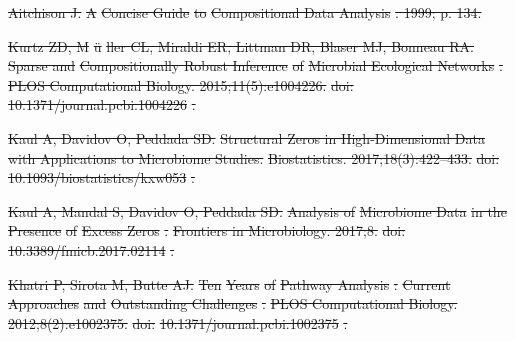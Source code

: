 \documentclass[10pt,letterpaper]{article}
\providecommand{\DIFdeltex}[1]{{\protect\color{red}\sout{#1}}}                      %
\providecommand{\DIFdel}[1]{\texorpdfstring{\DIFdeltex{#1}}{}} %
\begin{document}
\DIFdel{Aitchison J.
}%
\DIFdel{A }%
\DIFdel{Concise Guide}%
\DIFdel{to }%
\DIFdel{Compositional Data Analysis}%
\DIFdel{. 1999; p. 134.
}%

\DIFdel{Kurtz ZD, M}%
\DIFdel{\"u}%
\DIFdel{ller CL, Miraldi ER, Littman DR, Blaser MJ, Bonneau RA.
}%
\DIFdel{Sparse and }%
\DIFdel{Compositionally Robust Inference}%
\DIFdel{of }%
\DIFdel{Microbial
  Ecological Networks}%
\DIFdel{.
}%
\DIFdel{PLOS Computational Biology. 2015;11(5):e1004226.
}%
\DIFdel{doi:}%
\DIFdel{10.1371/journal.pcbi.1004226}%
\DIFdel{.
}%

\DIFdel{Kaul A, Davidov O, Peddada SD.
}%
\DIFdel{Structural Zeros in High-Dimensional Data with Applications to
  Microbiome Studies.
}%
\DIFdel{Biostatistics. 2017;18(3):422--433.
}%
\DIFdel{doi:}%
\DIFdel{10.1093/biostatistics/kxw053}%
\DIFdel{.
}%

\DIFdel{Kaul A, Mandal S, Davidov O, Peddada SD.
}%
\DIFdel{Analysis of }%
\DIFdel{Microbiome Data}%
\DIFdel{in the }%
\DIFdel{Presence}%
\DIFdel{of }%
\DIFdel{Excess
  Zeros}%
\DIFdel{.
}%
\DIFdel{Frontiers in Microbiology. 2017;8.
}%
\DIFdel{doi:}%
\DIFdel{10.3389/fmicb.2017.02114}%
\DIFdel{.
}%

\DIFdel{Khatri P, Sirota M, Butte AJ.
}%
\DIFdel{Ten }%
\DIFdel{Years}%
\DIFdel{of }%
\DIFdel{Pathway Analysis}%
\DIFdel{: }%
\DIFdel{Current Approaches}%
\DIFdel{and
  }%
\DIFdel{Outstanding Challenges}%
\DIFdel{.
}%
\DIFdel{PLOS Computational Biology. 2012;8(2):e1002375.
}%
\DIFdel{doi:}%
\DIFdel{10.1371/journal.pcbi.1002375}%
\DIFdel{.
}%
\end{document}
